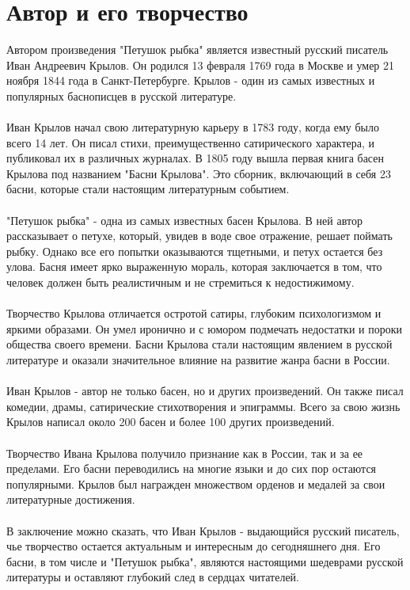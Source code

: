\documentclass{article}
\begin{document}
\newpage
\section{Автор и его творчество}
Автором произведения "{}Петушок рыбка"{} является известный русский писатель Иван Андреевич Крылов. Он родился 13 февраля 1769 года в Москве и умер 21 ноября 1844 года в Санкт-Петербурге. Крылов - один из самых известных и популярных баснописцев в русской литературе.\\
~\\
Иван Крылов начал свою литературную карьеру в 1783 году, когда ему было всего 14 лет. Он писал стихи, преимущественно сатирического характера, и публиковал их в различных журналах. В 1805 году вышла первая книга басен Крылова под названием "{}Басни Крылова"{}. Это сборник, включающий в себя 23 басни, которые стали настоящим литературным событием.\\
~\\
"{}Петушок рыбка"{} - одна из самых известных басен Крылова. В ней автор рассказывает о петухе, который, увидев в воде свое отражение, решает поймать рыбку. Однако все его попытки оказываются тщетными, и петух остается без улова. Басня имеет ярко выраженную мораль, которая заключается в том, что человек должен быть реалистичным и не стремиться к недостижимому.\\
~\\
Творчество Крылова отличается остротой сатиры, глубоким психологизмом и яркими образами. Он умел иронично и с юмором подмечать недостатки и пороки общества своего времени. Басни Крылова стали настоящим явлением в русской литературе и оказали значительное влияние на развитие жанра басни в России.\\
~\\
Иван Крылов - автор не только басен, но и других произведений. Он также писал комедии, драмы, сатирические стихотворения и эпиграммы. Всего за свою жизнь Крылов написал около 200 басен и более 100 других произведений.\\
~\\
Творчество Ивана Крылова получило признание как в России, так и за ее пределами. Его басни переводились на многие языки и до сих пор остаются популярными. Крылов был награжден множеством орденов и медалей за свои литературные достижения.\\
~\\
В заключение можно сказать, что Иван Крылов - выдающийся русский писатель, чье творчество остается актуальным и интересным до сегодняшнего дня. Его басни, в том числе и "{}Петушок рыбка"{}, являются настоящими шедеврами русской литературы и оставляют глубокий след в сердцах читателей.
\end{document}
